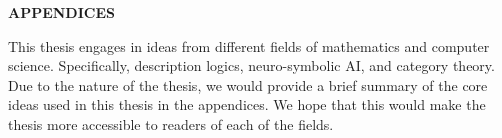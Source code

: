 
\appendix
		\newpage
		\begingroup
			\let\clearpage\relax
			\begin{center}
			\vspace*{2\baselineskip}
			{ \textbf{{\large APPENDICES}}} 
			\end{center}
			This thesis engages in ideas from different fields of mathematics and
			computer science. Specifically,
			description logics, neuro-symbolic AI, and category theory.
			Due to the nature of the thesis, we would provide a brief
			summary of the core ideas used in this thesis in the appendices.
			We hope that this would make the thesis more accessible to readers
			of each of the fields.
            
            
			
            
    \endgroup
